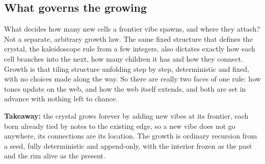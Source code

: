 \subsection{What governs the growing}

What decides how many new cells a frontier vibe spawns, and where they attach? Not a separate, arbitrary growth law. The same fixed structure that defines the crystal, the kaleidoscope rule from a few integers, also dictates exactly how each cell branches into the next, how many children it has and how they connect. Growth is that tiling structure unfolding step by step, deterministic and fixed, with no choices made along the way. So there are really two faces of one rule: how tones update on the web, and how the web itself extends, and both are set in advance with nothing left to chance.

\textbf{Takeaway:} the crystal grows forever by adding new vibes at its frontier, each born already tied by notes to the existing edge, so a new vibe does not go anywhere, its connections are its location. The growth is ordinary recursion from a seed, fully deterministic and append-only, with the interior frozen as the past and the rim alive as the present.
